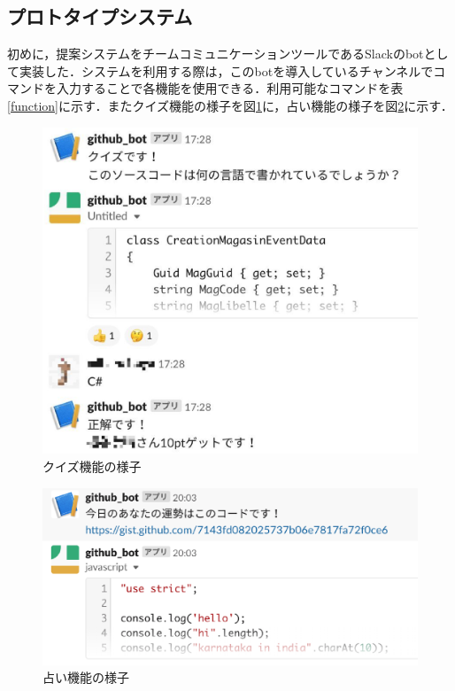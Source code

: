 \subsection{プロトタイプシステム}
初めに，提案システムをチームコミュニケーションツールであるSlackのbotとして実装した．システムを利用する際は，このbotを導入しているチャンネルでコマンドを入力することで各機能を使用できる．利用可能なコマンドを表\ref{function}に示す．またクイズ機能の様子を図\ref{prototype_quiz}に，占い機能の様子を図\ref{prototype_fortune}に示す．

\begin{figure}[!h]
  \begin{center}
    \includegraphics[width=0.6\linewidth]{image/prototype_quiz.eps}
  \end{center}
  \caption{クイズ機能の様子}
  \label{prototype_quiz}
\end{figure}

\begin{figure}[!h]
  \begin{center}
    \includegraphics[width=0.6\linewidth]{image/prototype_fortune.eps}
  \end{center}
    \vspace{-8mm} 
  \caption{占い機能の様子}
  \label{prototype_fortune}
\end{figure}

